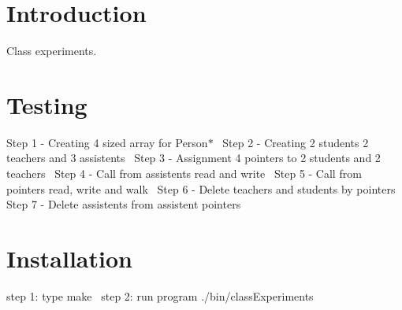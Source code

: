 \hypertarget{index_Introduction}{}\section{Introduction}\label{index_Introduction}
Class experiments.\hypertarget{index_Testing}{}\section{Testing}\label{index_Testing}
Step 1 -\/ Creating 4 sized array for Person$\ast$~\newline
Step 2 -\/ Creating 2 students 2 teachers and 3 assistents~\newline
Step 3 -\/ Assignment 4 pointers to 2 students and 2 teachers~\newline
Step 4 -\/ Call from assistents read and write~\newline
Step 5 -\/ Call from pointers read, write and walk~\newline
Step 6 -\/ Delete teachers and students by pointers~\newline
Step 7 -\/ Delete assistents from assistent pointers~\newline
 \hypertarget{index_Installation}{}\section{Installation}\label{index_Installation}
step 1\+: type make~\newline
step 2\+: run program ./bin/class\+Experiments 